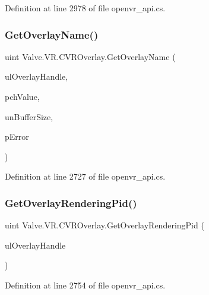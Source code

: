 Definition at line 2978 of file openvr\+\_\+api.\+cs.

\mbox{\label{class_valve_1_1_v_r_1_1_c_v_r_overlay_a98e6c5c559481da0602375dcd09276c0}} 
\subsubsection{\texorpdfstring{GetOverlayName()}{GetOverlayName()}}
{\footnotesize\ttfamily uint Valve.\+V\+R.\+C\+V\+R\+Overlay.\+Get\+Overlay\+Name (\begin{DoxyParamCaption}\item[{ulong}]{ul\+Overlay\+Handle,  }\item[{System.\+Text.\+String\+Builder}]{pch\+Value,  }\item[{uint}]{un\+Buffer\+Size,  }\item[{ref \mbox{\hyperlink{namespace_valve_1_1_v_r_aaee5c5144f42b7969d45b854f51b0c18}{E\+V\+R\+Overlay\+Error}}}]{p\+Error }\end{DoxyParamCaption})}



Definition at line 2727 of file openvr\+\_\+api.\+cs.

\mbox{\label{class_valve_1_1_v_r_1_1_c_v_r_overlay_aba8e674f3848298ac879e4e1e1f4161e}} 
\subsubsection{\texorpdfstring{GetOverlayRenderingPid()}{GetOverlayRenderingPid()}}
{\footnotesize\ttfamily uint Valve.\+V\+R.\+C\+V\+R\+Overlay.\+Get\+Overlay\+Rendering\+Pid (\begin{DoxyParamCaption}\item[{ulong}]{ul\+Overlay\+Handle }\end{DoxyParamCaption})}



Definition at line 2754 of file openvr\+\_\+api.\+cs.

\mbox{\label{class_valve_1_1_v_r_1_1_c_v_r_overlay_a71e8c48ef4e3a00ce3dd2795806407e3}} 
